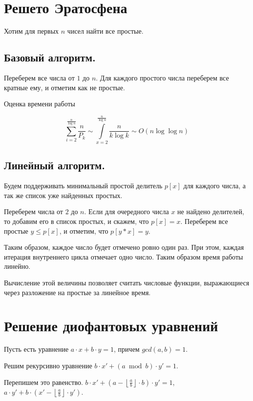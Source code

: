 \documentclass[12pt,a4paper]{article}
\renewcommand{\le}{\leqslant}
\theoremstyle{plain}
\begin{document}
\section{Решето Эратосфена}

Хотим для первых $n$ чисел найти все простые.

\subsection{Базовый алгоритм.}

Переберем все числа от $1$ до $n$. Для каждого простого числа
переберем все кратные ему, и отметим как не простые.

Оценка времени работы

$$\sum\limits_{i=2}^{\frac{n}{\log{n}}}{\frac{n}{P_k}} \sim \int\limits_{x=2}^{\frac{n}{\log{n}}}{\frac{n}{k \log{k}}} \sim O(n \log\log{n})$$

\subsection{Линейный алгоритм.}

Будем поддерживать минимальный простой делитель $p[x]$ для каждого числа,
а так же список уже найденных простых.

Переберем числа от $2$ до $n$. Если для очередного числа $x$ не найдено
делителей, то добавим его в список простых, и скажем, что 
$p[x] = x$. Переберем все простые $y \le p[x]$, и отметим, что $p[y*x] = y$.

Таким образом, каждое число будет отмечено ровно один раз. При этом,
каждая итерация внутреннего цикла отмечает одно число. Таким образом время 
работы линейно.

Вычисление этой величины позволяет считать числовые функции, выражающиеся через
разложение на простые за линейное время.

\section{Решение диофантовых уравнений}

Пусть есть уравнение $a \cdot x + b \cdot y = 1$, причем $gcd(a, b) = 1$.

Решим рекурсивно уравнение $b \cdot x' + (a \bmod b) \cdot y' = 1$.

Перепишем это равенство. $b \cdot x' + (a - \left\lfloor \frac{a}{b}\right\rfloor \cdot b) \cdot y' = 1$,
$a \cdot y' + b \cdot (x' - \left\lfloor \frac{a}{b}\right\rfloor \cdot y')$.
\end{document}

